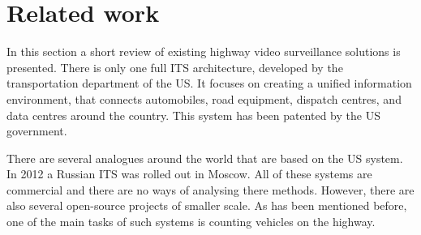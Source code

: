 \documentclass[12pt,a4paper,oneside,titlepage]{article}
\begin{document}
\newpage
\section{Related work}

In this section a short review of existing highway video surveillance solutions is presented.
There is only one full ITS architecture, developed by the transportation department of the US. It focuses on creating a unified information environment, that connects automobiles, road equipment, dispatch centres,  and data centres around the country. This system has been patented by the US government.

There are several analogues around the world that are based on the US system. In 2012 a Russian ITS was rolled out in Moscow. All of these systems are commercial and there are no ways of analysing there methods.
However, there are also several open-source projects of smaller scale.
As has been mentioned before, one of the main tasks of such systems is counting vehicles on the highway.
\end{document}
